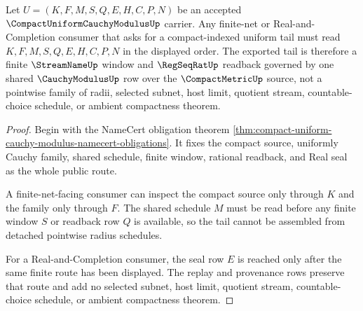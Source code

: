 \begin{theorem}\label{thm:compact-uniform-cauchy-modulus-finite-net-tail}
Let $U=(K,F,M,S,Q,E,H,C,P,N)$ be an accepted $\CompactUniformCauchyModulusUp$ carrier. Any finite-net or Real-and-Completion consumer that asks for a compact-indexed uniform tail must read $K,F,M,S,Q,E,H,C,P,N$ in the displayed order. The exported tail is therefore a finite $\StreamNameUp$ window and $\RegSeqRatUp$ readback governed by one shared $\CauchyModulusUp$ row over the $\CompactMetricUp$ source, not a pointwise family of radii, selected subnet, host limit, quotient stream, countable-choice schedule, or ambient compactness theorem.
\end{theorem}
\begin{proof}
Begin with the NameCert obligation theorem \autoref{thm:compact-uniform-cauchy-modulus-namecert-obligations}. It fixes the compact source, uniformly Cauchy family, shared schedule, finite window, rational readback, and Real seal as the whole public route.

A finite-net-facing consumer can inspect the compact source only through $K$ and the family only through $F$. The shared schedule $M$ must be read before any finite window $S$ or readback row $Q$ is available, so the tail cannot be assembled from detached pointwise radius schedules.

For a Real-and-Completion consumer, the seal row $E$ is reached only after the same finite route has been displayed. The replay and provenance rows preserve that route and add no selected subnet, host limit, quotient stream, countable-choice schedule, or ambient compactness theorem.
\end{proof}



